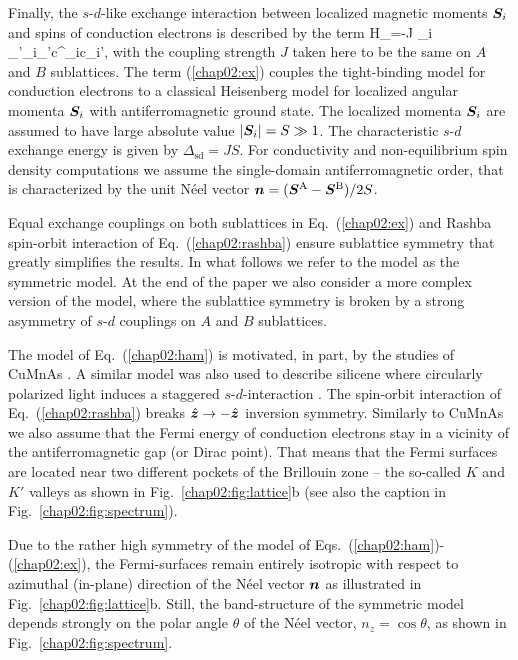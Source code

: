 Finally, the $s$-$d$-like exchange interaction between localized magnetic moments $\boldsymbol{S}_i$ and spins of conduction electrons is described by the term
\be
\label{chap02:ex}
H_=-J \s_{i} \s_{\sigma\sigma'}_i\cdot \bb{\sigma}_{\sigma\sigma'}c^\dagger_{i\sigma}c\0_{i\sigma'},
\e
with the coupling strength $J$ taken here to be the same on $A$ and $B$ sublattices. The term (\ref{chap02:ex}) couples the tight-binding model for conduction electrons to a  classical Heisenberg model for localized angular momenta $\boldsymbol{S}_i$ with antiferromagnetic ground state. The localized momenta $\boldsymbol{S}_i$ are assumed to have large absolute value $|\boldsymbol{S}_i|=S\gg 1$. The characteristic $s$-$d$ exchange energy is given by $\Delta_\text{sd} = J S$.  For conductivity and non-equilibrium spin density computations we assume the single-domain antiferromagnetic order, that is characterized by the unit N\'eel vector $\boldsymbol{n} = (\boldsymbol{S}^\textrm{A}-\boldsymbol{S}^\textrm{B})/2S$. 

Equal exchange couplings on both sublattices in Eq.~(\ref{chap02:ex}) and Rashba spin-orbit interaction of Eq.~(\ref{chap02:rashba}) ensure sublattice symmetry that greatly simplifies the results. In what follows we refer to the model as the symmetric model. At the end of the paper we also consider a more complex version of the model, where the sublattice symmetry is broken by a strong asymmetry of $s$-$d$ couplings on $A$ and $B$ sublattices.
 
The model of Eq.~(\ref{chap02:ham}) is motivated, in part, by the studies of CuMnAs \cite{smejkal_electric_2017}. A similar model was also used to describe silicene where circularly polarized light induces a staggered $s$-$d$-interaction \cite{ezawa_photoinduced_2013}. The spin-orbit interaction of Eq.~(\ref{chap02:rashba}) breaks $\hat{\boldsymbol{z}}\to -\hat{\boldsymbol{z}}$ inversion symmetry. Similarly to CuMnAs we also assume that the Fermi energy of conduction electrons stay in a vicinity of the antiferromagnetic gap (or Dirac point). That means that the Fermi surfaces are located near two different pockets of the Brillouin zone -- the so-called $K$ and $K'$ valleys as shown in Fig.~\ref{chap02:fig:lattice}b (see also the caption in Fig.~\ref{chap02:fig:spectrum}). 

Due to the rather high symmetry of the model of Eqs.~(\ref{chap02:ham})-(\ref{chap02:ex}), the Fermi-surfaces remain entirely isotropic with respect to azimuthal (in-plane) direction of the N\'eel vector $\boldsymbol{n}$ as illustrated in Fig.~\ref{chap02:fig:lattice}b. Still, the band-structure of the symmetric model depends strongly on the polar angle $\theta$ of the N\'eel vector, $n_z= \cos\theta$, as shown in Fig.~\ref{chap02:fig:spectrum}.

